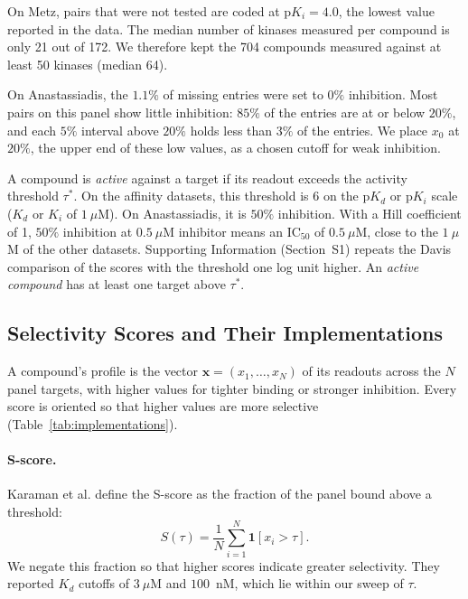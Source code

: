 On Metz, pairs that were not tested are coded at
$\mathrm{p}K_i = 4.0$, the lowest value reported in the data. The median number
of kinases measured per compound is only 21 out of 172. We therefore kept the
704 compounds measured against at least 50 kinases (median 64).

On Anastassiadis, the
$1.1\%$ of missing entries were set to $0\%$ inhibition. Most pairs on this
panel show little inhibition: $85\%$ of the entries are at or below $20\%$,
and each $5\%$ interval above $20\%$ holds less than $3\%$ of the entries. We
place $x_0$ at $20\%$, the upper end of these low values, as a chosen
cutoff for weak inhibition.

A compound is \emph{active} against a target if its readout exceeds the
activity threshold $\tau^*$. On the affinity datasets, this threshold is
$6$ on the $\mathrm{p}K_d$ or $\mathrm{p}K_i$ scale ($K_d$ or $K_i$ of $1~\mu$M).
On Anastassiadis, it is $50\%$ inhibition. With a Hill
coefficient of 1, $50\%$ inhibition at $0.5~\mu$M inhibitor means an IC$_{50}$
of $0.5~\mu$M, close to the $1~\mu$M of the other datasets. Supporting
Information (Section~S1) repeats the Davis comparison of the scores with the
threshold one log unit higher. An \emph{active compound} has at least one
target above $\tau^*$.

\subsection{Selectivity Scores and Their Implementations}
\label{sec:methods:defs}

A compound's profile is the vector $\mathbf{x} = (x_1, \ldots, x_N)$ of its
readouts across the $N$ panel targets, with higher values for tighter binding
or stronger inhibition. Every score is oriented so that higher values are more
selective (Table~\ref{tab:implementations}).

\paragraph{S-score.} Karaman et al.\cite{Karaman2008} define the S-score as the
fraction of the panel bound above a threshold:
\begin{equation}
  S(\tau) = \frac{1}{N} \sum_{i=1}^{N} \mathbf{1}[x_i > \tau].
\end{equation}
We negate this fraction so that higher scores indicate greater selectivity.
They reported $K_d$ cutoffs of $3~\mu$M and $100$~nM, which lie
within our sweep of $\tau$.

